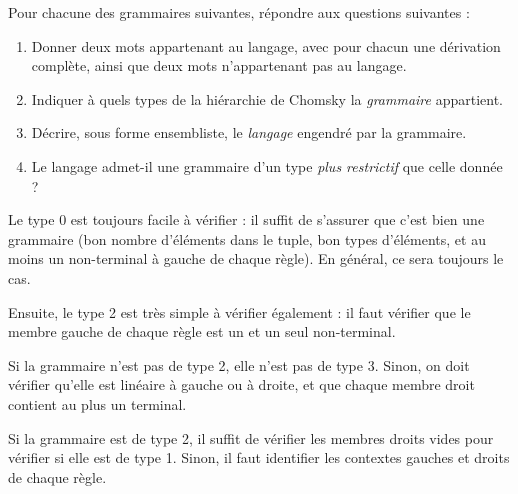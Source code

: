
\begingroup

\begin{exercice}\label{exo:languages/chomsky/types}

  Pour chacune des grammaires suivantes, répondre aux questions suivantes :

  \begin{enumerate}
  \item Donner deux mots appartenant au langage, avec pour chacun une dérivation complète,
    ainsi que deux mots n'appartenant pas au langage.
  \item Indiquer à quels types de la hiérarchie de Chomsky la \emph{grammaire} appartient.
  \item Décrire, sous forme ensembliste, le \emph{langage} engendré par la grammaire.
  \item Le langage admet-il une grammaire d'un type \emph{plus restrictif} que celle donnée ?
  \end{enumerate}

  \begin{corrections}
    Le type 0 est toujours facile à vérifier : il suffit de s'assurer que c'est bien une grammaire
    (bon nombre d'éléments dans le tuple, bon types d'éléments, et au moins un non-terminal à gauche de chaque règle).
    En général, ce sera toujours le cas.

    Ensuite, le type 2 est très simple à vérifier également :
    il faut vérifier que le membre gauche de chaque règle est un et un seul non-terminal.

    Si la grammaire n'est pas de type 2, elle n'est pas de type 3.
    Sinon, on doit vérifier qu'elle est linéaire à gauche ou à droite,
    et que chaque membre droit contient au plus un terminal. 

    Si la grammaire est de type 2, il suffit de vérifier les membres droits vides pour vérifier si elle est de type 1.
    Sinon, il faut identifier les contextes gauches et droits de chaque règle. 
  \end{corrections}


\end{exercice}
